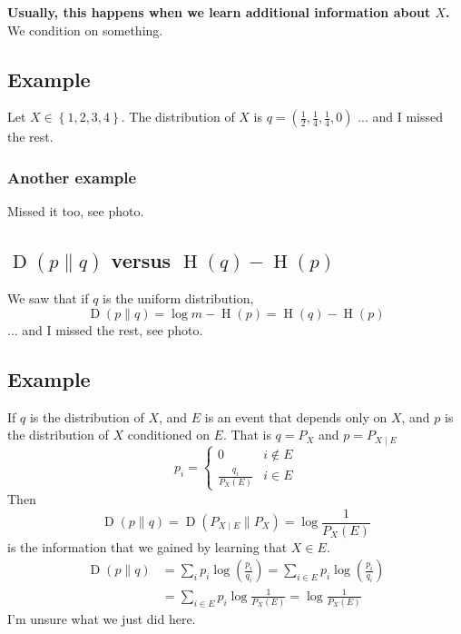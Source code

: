 \documentclass{article}
\begin{document}
\textbf{Usually, this happens when we learn additional information about $X$.} We condition on something.

\subsection{Example}

Let $X\in\left\{1,2,3,4\right\}$. The distribution of $X$ is $q=\left(\frac{1 }{2}, \frac{1 }{4 },\frac{1 }{4 },0\right)$ ... and I missed the rest.

\subsubsection{Another example}

Missed it too, see photo.

\subsection{$\operatorname{D}\left(p\| q\right)$ versus $\operatorname{H}(q)-\operatorname{H}(p)$}

We saw that if $q$ is the uniform distribution,
\[
\operatorname{D}\left(p\| q\right) = \log m - \operatorname{H}(p) = \operatorname{H}(q)-\operatorname{H}(p)
\]
... and I missed the rest, see photo.

\subsection{Example}

If $q$ is the distribution of $X$, and $E$ is an event that depends only on $X$, and $p$ is the distribution of $X$ conditioned on $E$. That is $q=P_X$ and $p=P_{X\mid E}$
\[
p_i = \begin{cases}
   0 & i\notin E \\
   \frac{q_i}{P_X(E)} & i\in E
\end{cases}
\]
Then 
\[
\operatorname{D}\left(p\| q\right) = \operatorname{D}\left(P_{X\mid E}\| P_X\right) = \log \frac{1}{P_X(E)}
\]
is the information that we gained by learning that $X\in E$.
\begin{align*}
    \operatorname{D}\left(p\| q\right) &= \sum_i p_i\log \left(\frac{p_i }{q_i}\right) = \sum_{i\in E} p_i\log\left(\frac{p_i }{q_i}\right)\\
    &= \sum_{i\in E}p_i  \log \frac{1}{P_X(E)} =  \log \frac{1}{P_X(E)}
\end{align*}
I'm unsure what we just did here.
\end{document}

